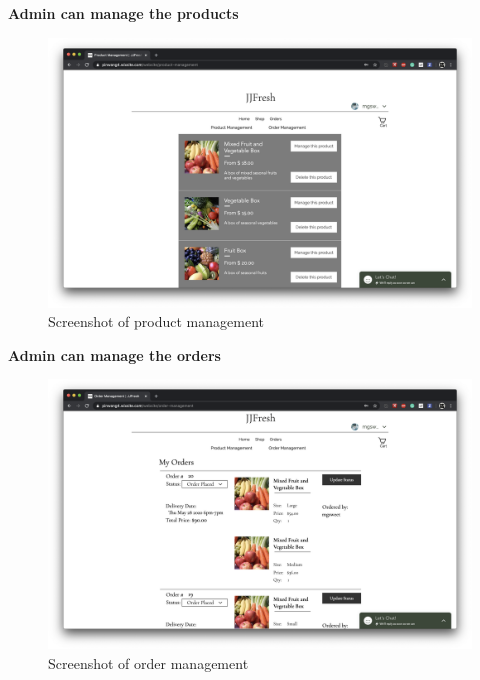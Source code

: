 \documentclass{report}
\begin{document}
\clearpage
\textbf{Admin can manage the products}
\begin{figure}[htp]
\centering
\includegraphics[width=\textwidth]{Figures/adminProduct.png}
\caption{Screenshot of product management}
\label{fig:adminProduct}
\end{figure}

\clearpage
\textbf{Admin can manage the orders}
\begin{figure}[htp]
\centering
\includegraphics[width=\textwidth]{Figures/adminOrder.png}
\caption{Screenshot of order management}
\label{fig:adminOrder}
\end{figure}
\end{document}
